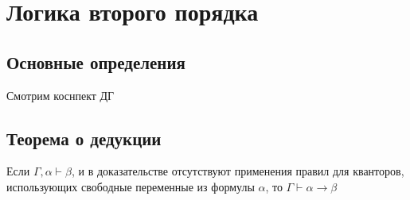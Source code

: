 \section{Логика второго порядка}
\label{sec-7}
\subsection{Основные определения}
\label{sec-7-1}
Смотрим коснпект ДГ
\subsection{Теорема о дедукции}
\label{sec-7-2}
\begin{theorem}
Если $\Gamma, \alpha \vdash \beta$, и в доказательстве отсутствуют применения правил для кванторов, использующих свободные переменные  из формулы $\alpha$, то $\Gamma \vdash \alpha \rightarrow \beta$
\end{theorem}
